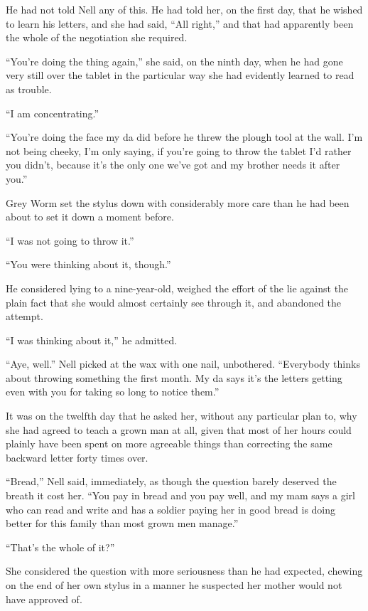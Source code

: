 He had not told Nell any of this. He had told her, on the first day, that he wished to learn his letters, and she had said, “All right,” and that had apparently been the whole of the negotiation she required.

\sceneBreak

“You’re doing the thing again,” she said, on the ninth day, when he had gone very still over the tablet in the particular way she had evidently learned to read as trouble.

“I am concentrating.”

“You’re doing the face my da did before he threw the plough tool at the wall. I’m not being cheeky, I’m only saying, if you’re going to throw the tablet I’d rather you didn’t, because it’s the only one we’ve got and my brother needs it after you.”

Grey Worm set the stylus down with considerably more care than he had been about to set it down a moment before.

“I was not going to throw it.”

“You were thinking about it, though.”

He considered lying to a nine-year-old, weighed the effort of the lie against the plain fact that she would almost certainly see through it, and abandoned the attempt.

“I was thinking about it,” he admitted.

“Aye, well.” Nell picked at the wax with one nail, unbothered. “Everybody thinks about throwing something the first month. My da says it’s the letters getting even with you for taking so long to notice them.”

\sceneBreak

It was on the twelfth day that he asked her, without any particular plan to, why she had agreed to teach a grown man at all, given that most of her hours could plainly have been spent on more agreeable things than correcting the same backward letter forty times over.

“Bread,” Nell said, immediately, as though the question barely deserved the breath it cost her. “You pay in bread and you pay well, and my mam says a girl who can read and write and has a soldier paying her in good bread is doing better for this family than most grown men manage.”

“That’s the whole of it?”

She considered the question with more seriousness than he had expected, chewing on the end of her own stylus in a manner he suspected her mother would not have approved of.

